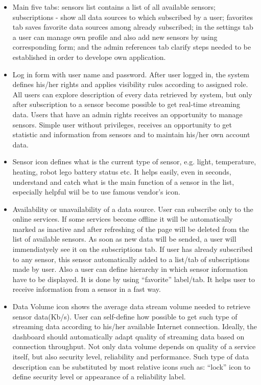      \begin{itemize}
      \item Main five tabs: sensors list contains a list of all available sensors; subscriptions - show all data sources to which subscribed by a user; favorites tab saves favorite data sources among already subscribed; in the settings tab a user can manage own profile and also add new sensors by using corresponding form; and the admin references tab clarify steps needed to be established in order to develope own application.
      \item Log in form with user name and password. After user logged in, the system defines his/her rights and applies visibility rules according to assigned role. All users can explore description of every data retrieved by system, but only after subscription to a sensor become possible to get real-time streaming data. Users that have an admin rights receives an opportunity to manage sensors. Simple user without privileges, receives an opportunity to get statistic and information from sensors and to maintain his/her own account data.
      \item Sensor icon defines what is the current type of sensor, e.g. light, temperature, heating, robot lego battery status etc. It helps easily, even in seconds, understand and catch what is the main function of a sensor in the list, especially helpful wiil be to use famous vendor's icon.
      \item Availability or unavailability of a data source. User can subscribe only to the online services. If some services become offline it will be automatically marked as inactive and after refreshing of the page will be deleted from the list of available sensors. As soon as new data will be sended, a user will immendiatyely see it on the subscriptions tab. If user has already subscribed to any sensor, this sensor automatically added to a list/tab of subscriptions made by user. Also a user can define hierarchy in which sensor information have to be displayed. It is done by using ``favorite'' label/tab. It helps user to receive information from a sensor in a fast way.
      \item Data Volume icon shows the average data stream volume needed to retrieve sensor data(Kb/s). User can self-define how possible to get such type of streaming data according to his/her available Internet connection. Ideally, the dashboard should automatically adapt quality of streaming data based on connection throughput. Not only data volume depends on quality of a service itself, but also security level, reliability and performance. Such type of data description can be substituted by most relative icons such as: ``lock'' icon to define security level or appearance of a reliability label.

\end{itemize}
